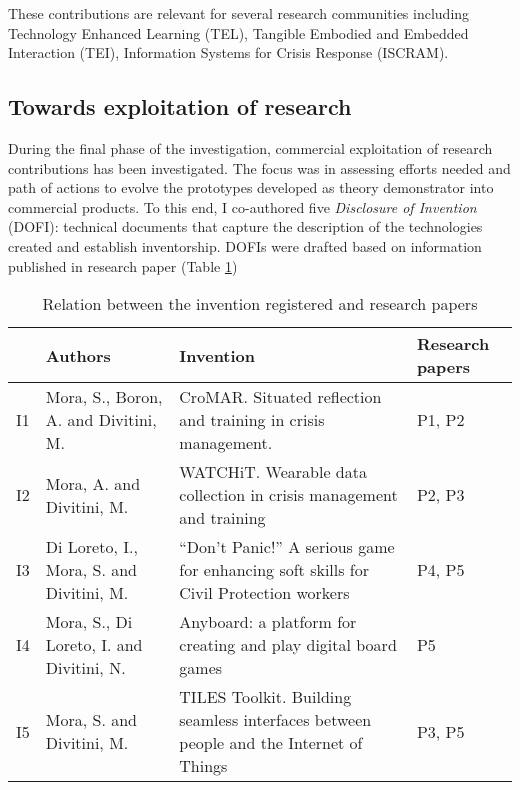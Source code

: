 These contributions are relevant for several research communities including Technology Enhanced Learning (TEL), Tangible Embodied and Embedded Interaction (TEI), Information Systems for Crisis Response (ISCRAM).

\subsection{Towards exploitation of research}\label{exploitation-of-research-contributions}

During the final phase of the investigation, commercial exploitation of research contributions has been investigated. The focus was in assessing efforts needed and path of actions to evolve the prototypes developed as theory demonstrator into commercial products. To this end, I co-authored five \emph{Disclosure of Invention} (DOFI): technical documents that capture the description of the technologies created and establish inventorship. DOFIs were drafted based on information published in research paper (Table \ref{tab:papers-inventions})

\begin{table}
	[tbh] \centering \caption{Relation between the invention registered and research papers} \label{tab:papers-inventions} 
	\begin{tabular}
		{p{}p{}p{}p{}} \toprule & Authors & Invention & Research papers \\
		\midrule I1 & Mora, S., Boron, A. and Divitini, M. & CroMAR. Situated reflection and training in crisis management. & P1, P2 \\
		\noalign{\smallskip} I2 & Mora, A. and Divitini, M. & WATCHiT. Wearable data collection in crisis management and training & P2, P3 \\
		\noalign{\smallskip} I3 & Di Loreto, I., Mora, S. and Divitini, M. & ``Don’t Panic!'' A serious game for enhancing soft skills for Civil Protection workers & P4, P5 \\
		\noalign{\smallskip} I4 & Mora, S., Di Loreto, I. and Divitini, N. & Anyboard: a platform for creating and play digital board games & P5 \\
		\noalign{\smallskip} I5 & Mora, S. and Divitini, M. & TILES Toolkit. Building seamless interfaces between people and the Internet of Things & P3, P5 \\
		\bottomrule 
	\end{tabular}
\end{table}

